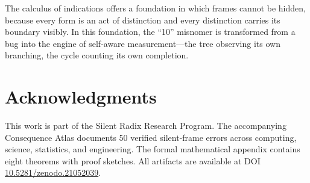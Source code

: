 \documentclass[12pt,a4paper]{article}
\theoremstyle{definition}
\theoremstyle{remark}
\begin{document}
The calculus of indications offers a foundation in which frames cannot be hidden, because every form is an act of distinction and every distinction carries its boundary visibly. In this foundation, the ``10'' misnomer is transformed from a bug into the engine of self-aware measurement---the tree observing its own branching, the cycle counting its own completion.

\section*{Acknowledgments}
This work is part of the Silent Radix Research Program. The accompanying Consequence Atlas documents 50 verified silent-frame errors across computing, science, statistics, and engineering. The formal mathematical appendix contains eight theorems with proof sketches. All artifacts are available at DOI \href{https://doi.org/10.5281/zenodo.21052039}{10.5281/zenodo.21052039}.
\end{document}
